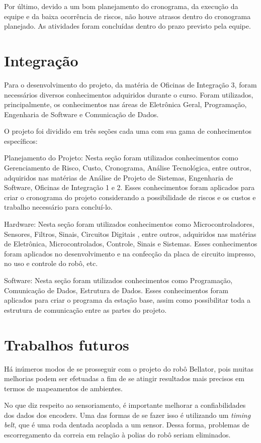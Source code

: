 Por último, devido a um bom planejamento do cronograma, da execução da equipe e da baixa ocorrência de riscos, não houve atrasos dentro do cronograma planejado. As atividades foram concluídas dentro do prazo previsto pela equipe.

\section{Integração}

Para o desenvolvimento do projeto, da matéria de Oficinas de Integração 3, foram necessários diversos conhecimentos adquiridos durante o curso. Foram utilizados, principalmente, os conhecimentos nas áreas de Eletrônica Geral, Programação, Engenharia de Software e Comunicação de Dados.

O projeto foi dividido em três seções cada uma com sua gama de conhecimentos específicos:

Planejamento do Projeto: Nesta seção foram utilizados conhecimentos como Gerenciamento de Risco, Custo, Cronograma, Análise Tecnológica, entre outros, adquiridos nas matérias de Análise de Projeto de Sistemas, Engenharia de Software, Oficinas de Integração 1 e 2. Esses conhecimentos foram aplicados para criar o cronograma do projeto considerando a possibilidade de riscos e os custos e trabalho necessário para concluí-lo.

Hardware: Nesta seção foram utilizados conhecimentos como Microcontroladores, Sensores, Filtros, Sinais, Circuitos Digitais , entre outros, adquiridos nas matérias de Eletrônica, Microcontrolados, Controle, Sinais e Sistemas. Esses conhecimentos foram aplicados no desenvolvimento e na confecção da placa de circuito impresso, no uso e controle do robô, etc.

Software: Nesta seção foram utilizados conhecimentos como Programação, Comunicação de Dados, Estrutura de Dados. Esses conhecimentos foram aplicados para criar o programa da estação base, assim como possibilitar toda a estrutura de comunicação entre as partes do projeto.

\section{Trabalhos futuros}

Há inúmeros modos de se prosseguir com o projeto do robô Bellator, pois muitas melhorias podem ser efetuadas a fim de se atingir resultados mais precisos em termos de mapeamentos de ambientes.

No que diz respeito ao sensoriamento, é importante melhorar a confiabilidades dos dados dos encoders. Uma das formas de se fazer isso é utilizando um \textit{timing belt}, que é uma roda dentada acoplada a um sensor. Dessa forma, problemas de escorregamento da correia em relação à polias do robô seriam eliminados.

